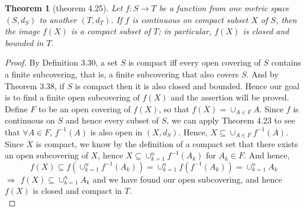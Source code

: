 \documentclass[aps,pra,notitlepage,amsmath,amssymb,letterpaper,12pt]{revtex4-1}
\newtheorem{theorem}{Theorem}
\begin{document}
\begin{theorem}[theorem 4.25]
Let $f:S \to T$  be a function from one metric space $(S,d_{S})$ to another $(T,d_{T})$. If $f$ is continuous on compact subset $X$ of $S$, then the image $f(X)$ is a compact subset of $T$; in particular, $f(X)$ is closed and bounded in $T$.
\end{theorem}
\begin{proof}
By Definition 3.30, a set $S$ is compact iff every open covering of $S$ contains a finite subcovering, that is, a finite subcovering that also covers $S$. And by Theorem 3.38, if $S$ is compact then it is also closed and bounded.
\newline{}
Hence our goal is to find a finite open subcovering of $f(X)$ and the assertion will be proved. Define $F$ to be an open covering of $f(X)$, so that $f(X) = \cup_{A \in F}A$. Since $f$ is continuous on $S$ and hence every subset of $S$, we can apply Theorem 4.23 to see that $\forall A \in F$, $f^{-1}(A)$ is also open in $(X,d_{S})$. Hence, $X \subseteq \cup_{A \in F}f^{-1}(A) $. Since $X$ is compact, we know by the definition of a compact set that there exists an open subcovering of $X$, hence $X \subseteq \cup_{k = 1}^{n}f^{-1}(A_{k}) $ for $A_{k} \in F$. And hence,
$$ f(X) \subseteq f(\cup_{k = 1}^{n}f^{-1}(A_{k})) = \cup_{k = 1}^{n}f(f^{-1}(A_{k})) = \cup_{k = 1}^{n}A_{k} $$
$\Rightarrow$ $f(X) \subseteq\cup_{k = 1}^{n}A_{k}$ and we have found our open subcovering, and hence $f(X)$ is closed and compact in $T$.
$$ $$
$$ $$
\end{proof}
\end{document}
